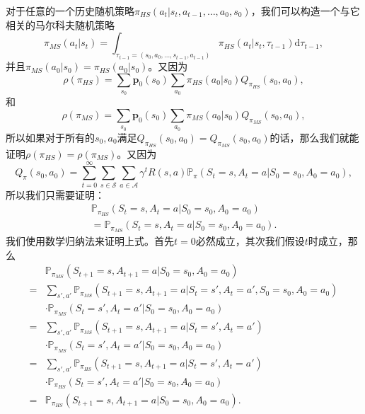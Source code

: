 对于任意的一个历史随机策略$\pi_{HS}(a_t \vert s_t, a_{t-1}, \ldots, a_0, s_0)$，我们可以构造一个与它相关的马尔科夫随机策略
\begin{equation}
    \pi_{MS}(a_t \vert s_t)
    = \int_{\tau_{t-1}=(s_0, a_0, \ldots, s_{t-1}, a_{t-1})}
    \pi_{HS}(a_t \vert s_t, \tau_{t-1}) \mathrm{d}\tau_{t-1},
\end{equation}
并且$\pi_{MS}(a_0 \vert s_0) = \pi_{HS}(a_0 \vert s_0)$。又因为
\begin{equation}
    \rho(\pi_{HS}) = \sum_{s_0}\mathbf{p}_0(s_0) \sum_{a_0}
    \pi_{HS}(a_0 \vert s_0) Q_{\pi_{HS}}(s_0, a_0),
\end{equation}
和
\begin{equation}
    \rho(\pi_{MS}) = \sum_{s_0}\mathbf{p}_0(s_0) \sum_{a_0}
    \pi_{MS}(a_0 \vert s_0) Q_{\pi_{MS}}(s_0, a_0),
\end{equation}
所以如果对于所有的$s_0, a_0$满足$Q_{\pi_{HS}}(s_0, a_0) = Q_{\pi_{MS}}(s_0, a_0)$的话，那么我们就能证明$\rho(\pi_{HS}) = \rho(\pi_{MS})$。又因为
\begin{equation}
    Q_{\pi}(s_0, a_0) = \sum^{\infty}_{t=0} \sum_{s \in \mathcal{S}}
    \sum_{a \in \mathcal{A}} \gamma^t R(s, a) 
    \mathbb{P}_{\pi}(S_t = s, A_t = a \vert S_0 = s_0, A_0 = a_0),
\end{equation}
所以我们只需要证明：
\begin{equation}
    \begin{aligned}
    \mathbb{P}_{\pi_{HS}}(S_t = s, A_t = a \vert S_0 = s_0, A_0 = a_0)
    \\= \mathbb{P}_{\pi_{MS}}(S_t = s, A_t = a \vert S_0 = s_0, A_0 = a_0).
    \end{aligned}
\end{equation}
我们使用数学归纳法来证明上式。首先$t=0$必然成立，其次我们假设$t$时成立，那么
\begin{equation}
    \begin{aligned}
        &\mathbb{P}_{\pi_{MS}}(S_{t+1} = s, A_{t+1} = a \vert S_0 = s_0, A_0 = a_0)\\
        =& \sum_{s', a'}\mathbb{P}_{\pi_{MS}}(S_{t+1} = s, A_{t+1} = a 
            \vert S_t = s', A_t = a', S_0 = s_0, A_0 = a_0)\\
        &\cdot\mathbb{P}_{\pi_{MS}}(S_t = s', A_t = a' \vert S_0 = s_0, A_0 = a_0)\\
        =& \sum_{s', a'}\mathbb{P}_{\pi_{MS}}(S_{t+1} = s, A_{t+1} = a \vert S_t = s', A_t = a')\\
        &\cdot\mathbb{P}_{\pi_{MS}}(S_t = s', A_t = a' \vert S_0 = s_0, A_0 = a_0)\\
        =& \sum_{s', a'}\mathbb{P}_{\pi_{HS}}(S_{t+1} = s, A_{t+1} = a 
        \vert S_t = s', A_t = a')\\
        &\cdot\mathbb{P}_{\pi_{HS}}(S_t = s', A_t = a' \vert S_0 = s_0, A_0 = a_0)\\
        =& \mathbb{P}_{\pi_{HS}}(S_{t+1} = s, A_{t+1} = a \vert 
        S_0 = s_0, A_0 = a_0).
    \end{aligned}
\end{equation}
